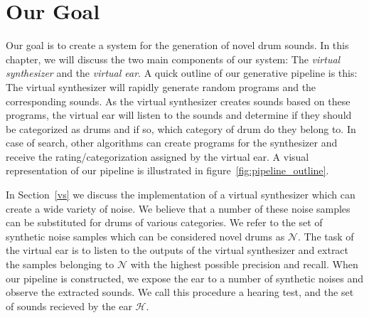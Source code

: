 \documentclass[\main/thesis.tex]{subfiles}
\begin{document}

\section{Our Goal}
Our goal is to create a system for the generation of novel drum sounds. In this chapter, we will discuss the two main components of our system: The \textit{virtual synthesizer} and the \textit{virtual ear}. A quick outline of our generative pipeline is this: The virtual synthesizer will rapidly generate random programs and the corresponding sounds. As the virtual synthesizer creates sounds based on these programs, the virtual ear will listen to the sounds and determine if they should be categorized as drums and if so, which category of drum do they belong to. In case of search, other algorithms can create programs for the synthesizer and receive the rating/categorization assigned by the virtual ear. A visual representation of our pipeline is illustrated in  figure~\ref{fig:pipeline_outline}.

In Section~\ref{vs} we discuss the implementation of a virtual synthesizer which can create a wide variety of noise. We believe that a number of these noise samples can be substituted for drums of various categories. We refer to the set of synthetic noise samples which can be considered novel drums as $\mathcal{N}$. The task of the virtual ear is to listen to the outputs of the virtual synthesizer and extract the samples belonging to $\mathcal{N}$ with the highest possible precision and recall. When our pipeline is constructed, we expose the ear to a number of synthetic noises and observe the extracted sounds. We call this procedure a hearing test, and the set of sounds recieved by the ear $\mathcal{H}$. 
\end{document}
